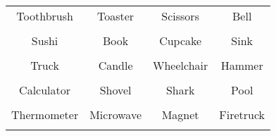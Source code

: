 \documentclass[12pt,a4paper]{article}
\begin{document}
\thispagestyle{empty}
\begin{table}[]
\centering
\Huge
\begin{tabular}{cccc}
 Toothbrush& Toaster& Scissors& Bell\\  & & & \\
 Sushi& Book& Cupcake& Sink\\  & & & \\
 Truck& Candle& Wheelchair& Hammer\\  & & & \\
 Calculator& Shovel& Shark& Pool\\  & & & \\
 Thermometer& Microwave& Magnet& Firetruck\\  & & & \\
\end{tabular}
\end{table}
\end{document}
